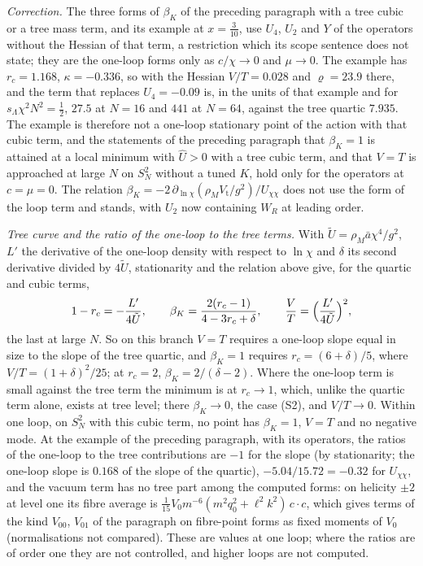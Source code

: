 \emph{Correction.} The three forms of \(\beta_K\) of the preceding paragraph with a tree cubic or a tree mass term, and its example at \(x=\tfrac3{10}\), use \(U_4\), \(U_2\) and \(Y\) of the operators without the Hessian of that term, a restriction which its scope sentence does not state; they are the one-loop forms only as \(c/\chi\to0\) and \(\mu\to0\). The example has \(r_c=1.168\), \(\kappa=-0.336\), so with the Hessian \(V/T=0.028\) and \(\varrho=23.9\) there, and the term that replaces \(U_4=-0.09\) is, in the units of that example and for \(s_\Lambda\chi^2N^2=\tfrac12\), \(27.5\) at \(N=16\) and \(441\) at \(N=64\), against the tree quartic \(7.935\). The example is therefore not a one-loop stationary point of the action with that cubic term, and the statements of the preceding paragraph that \(\beta_K=1\) is attained at a local minimum with \(\hat U>0\) with a tree cubic term, and that \(V=T\) is approached at large \(N\) on \(S^2_N\) without a tuned \(K\), hold only for the operators at \(c=\mu=0\). The relation \(\beta_K=-2\,\partial_{\ln\chi}(\rho_MV_{\mathrm t}/g^2)/U_{\chi\chi}\) does not use the form of the loop term and stands, with \(U_2\) now containing \(W_R\) at leading order.

\emph{Tree curve and the ratio of the one-loop to the tree terms.} With \(\tilde U=\rho_M\bar a\chi^4/g^2\), \(L'\) the derivative of the one-loop density with respect to \(\ln\chi\) and \(\delta\) its second derivative divided by \(4\tilde U\), stationarity and the relation above give, for the quartic and cubic terms,
\[
  1-r_c=-\frac{L'}{4\tilde U},\qquad \beta_K=\frac{2(r_c-1)}{4-3r_c+\delta},\qquad \frac VT=\Bigl(\frac{L'}{4\tilde U}\Bigr)^2 ,
\]
the last at large \(N\). So on this branch \(V=T\) requires a one-loop slope equal in size to the slope of the tree quartic, and \(\beta_K=1\) requires \(r_c=(6+\delta)/5\), where \(V/T=(1+\delta)^2/25\); at \(r_c=2\), \(\beta_K=2/(\delta-2)\). Where the one-loop term is small against the tree term the minimum is at \(r_c\to1\), which, unlike the quartic term alone, exists at tree level; there \(\beta_K\to0\), the case (S2), and \(V/T\to0\). Within one loop, on \(S^2_N\) with this cubic term, no point has \(\beta_K=1\), \(V=T\) and no negative mode. At the example of the preceding paragraph, with its operators, the ratios of the one-loop to the tree contributions are \(-1\) for the slope (by stationarity; the one-loop slope is \(0.168\) of the slope of the quartic), \(-5.04/15.72=-0.32\) for \(U_{\chi\chi}\), and the vacuum term has no tree part among the computed forms: on helicity \(\pm2\) at level one its fibre average is \(\tfrac1{15}V_0m^{-6}(m^2q_0^2+\ell^2k^2)\,c\cdot c\), which gives terms of the kind \(V_{00}\), \(V_{01}\) of the paragraph on fibre-point forms as fixed moments of \(V_0\) (normalisations not compared). These are values at one loop; where the ratios are of order one they are not controlled, and higher loops are not computed.

